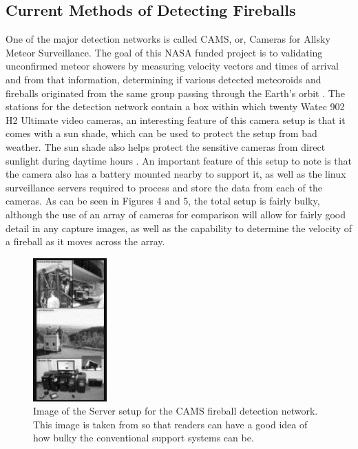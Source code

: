 \subsection{Current Methods of Detecting Fireballs}
One of the major detection networks is called CAMS, or, Cameras for Allsky Meteor Surveillance. 
The goal of this NASA funded project is to validating unconfirmed meteor showers by measuring velocity vectors and times of arrival and from that information, determining if various detected meteoroids and fireballs originated from the same group passing through the Earth's orbit \cite{jenniskens}. 
The stations for the detection network contain a box within which twenty Watec 902 H2 Ultimate video cameras, an interesting feature of this camera setup is that it comes with a sun shade, which can be used to protect the setup from bad weather. 
The sun shade also helps protect the sensitive cameras from direct sunlight during daytime hours \cite{jenniskens}. 
An important feature of this setup to note is that the camera also has a battery mounted nearby to support it, as well as the linux surveillance servers required to process and store the data from each of the cameras.
As can be seen in Figures 4 and 5, the total setup is fairly bulky, although the use of an array of cameras for comparison will allow for fairly good detail in any capture images, as well as the capability to determine the velocity of a fireball as it moves across the array.

\begin{figure}
    \centering
    \includegraphics[scale=1.5]{CAMS-Server-Setup.png}
    \caption{Image of the Server setup for the CAMS fireball detection network. This image is taken from \cite{jenniskens} so that readers can have a good idea of how bulky the conventional support systems can be.}
    \label{Figure 4}
\end{figure}

